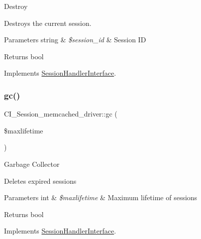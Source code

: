 Destroy

Destroys the current session.


\begin{DoxyParams}[1]{Parameters}
string & {\em \$session\+\_\+id} & Session ID \\
\hline
\end{DoxyParams}
\begin{DoxyReturn}{Returns}
bool 
\end{DoxyReturn}


Implements \mbox{\hyperlink{interface_session_handler_interface}{Session\+Handler\+Interface}}.

\mbox{\label{class_c_i___session__memcached__driver_a9f1a589deb45162bf31e84159f9949d8}} 
\subsubsection{\texorpdfstring{gc()}{gc()}}
{\footnotesize\ttfamily C\+I\+\_\+\+Session\+\_\+memcached\+\_\+driver\+::gc (\begin{DoxyParamCaption}\item[{}]{\$maxlifetime }\end{DoxyParamCaption})}

Garbage Collector

Deletes expired sessions


\begin{DoxyParams}[1]{Parameters}
int & {\em \$maxlifetime} & Maximum lifetime of sessions \\
\hline
\end{DoxyParams}
\begin{DoxyReturn}{Returns}
bool 
\end{DoxyReturn}


Implements \mbox{\hyperlink{interface_session_handler_interface}{Session\+Handler\+Interface}}.

\mbox{\label{class_c_i___session__memcached__driver_adb9377b12dcb93b72ef4ac914a3b7fb0}} 
